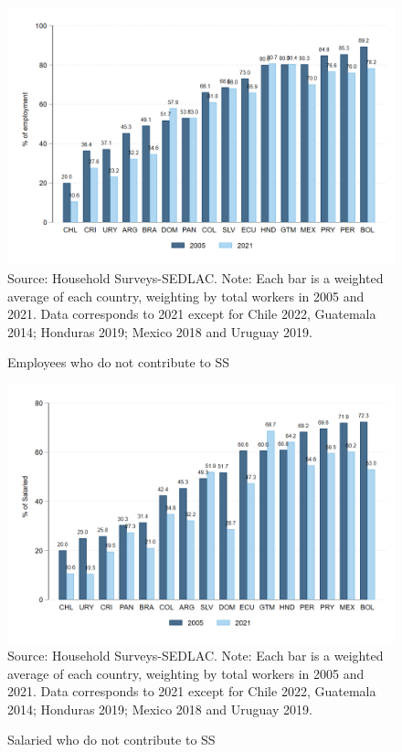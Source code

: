 \documentclass[english]{article}
\begin{document}
\begin{itemize}
\begin{figure}[!htb]
    \justifying
     \caption{Employees who do not contribute to SS}     
     \includegraphics[scale=.3]{latex/figures/Snapshot/snapshot_informal_ss.png}
    \label{fig:SalariedSS}
    \footnotesize{Source: Household Surveys-SEDLAC.}
    \footnotesize{Note: Each bar is a weighted average of each country, weighting by total workers in 2005 and 2021.  Data corresponds to 2021 except for Chile 2022, Guatemala 2014; Honduras 2019; Mexico 2018 and Uruguay 2019.}
\end{figure}

\begin{figure}[!htb]
    \justifying
     \caption{Salaried who do not contribute to SS}     
     \includegraphics[scale=.3]{latex/figures/Snapshot/snapshot_informal_ss_dep.png}
    \label{fig:SalariedSS}
    \footnotesize{Source: Household Surveys-SEDLAC.}
    \footnotesize{Note: Each bar is a weighted average of each country, weighting by total workers in 2005 and 2021.  Data corresponds to 2021 except for Chile 2022, Guatemala 2014; Honduras 2019; Mexico 2018 and Uruguay 2019.}
\end{figure}


\end{itemize}
\end{document}
